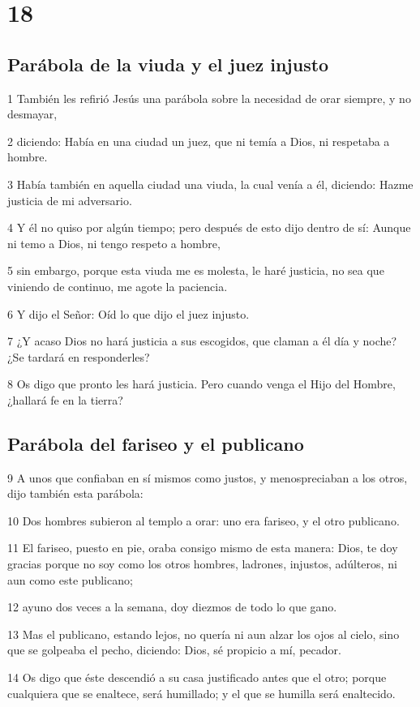 \chapter{18}

\section*{Parábola de la viuda y el juez injusto}

\par 1 También les refirió Jesús una parábola sobre la necesidad de orar siempre, y no desmayar,
\par 2 diciendo: Había en una ciudad un juez, que ni temía a Dios, ni respetaba a hombre.
\par 3 Había también en aquella ciudad una viuda, la cual venía a él, diciendo: Hazme justicia de mi adversario.
\par 4 Y él no quiso por algún tiempo; pero después de esto dijo dentro de sí: Aunque ni temo a Dios, ni tengo respeto a hombre,
\par 5 sin embargo, porque esta viuda me es molesta, le haré justicia, no sea que viniendo de continuo, me agote la paciencia.
\par 6 Y dijo el Señor: Oíd lo que dijo el juez injusto.
\par 7 ¿Y acaso Dios no hará justicia a sus escogidos, que claman a él día y noche? ¿Se tardará en responderles?
\par 8 Os digo que pronto les hará justicia. Pero cuando venga el Hijo del Hombre, ¿hallará fe en la tierra?

\section*{Parábola del fariseo y el publicano}

\par 9 A unos que confiaban en sí mismos como justos, y menospreciaban a los otros, dijo también esta parábola:
\par 10 Dos hombres subieron al templo a orar: uno era fariseo, y el otro publicano.
\par 11 El fariseo, puesto en pie, oraba consigo mismo de esta manera: Dios, te doy gracias porque no soy como los otros hombres, ladrones, injustos, adúlteros, ni aun como este publicano;
\par 12 ayuno dos veces a la semana, doy diezmos de todo lo que gano.
\par 13 Mas el publicano, estando lejos, no quería ni aun alzar los ojos al cielo, sino que se golpeaba el pecho, diciendo: Dios, sé propicio a mí, pecador.
\par 14 Os digo que éste descendió a su casa justificado antes que el otro; porque cualquiera que se enaltece, será humillado; y el que se humilla será enaltecido.

